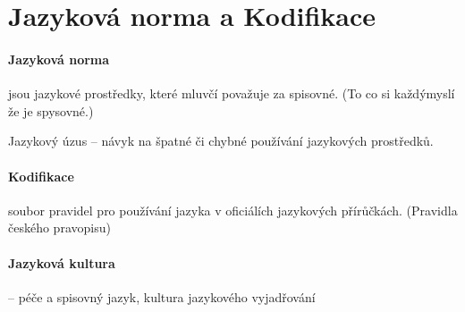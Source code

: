 \documentclass[10pt,a4page,headings,openany,%
oneside
,twocolumn
]{report}
\begin{document}
\section{Jazyková norma a Kodifikace}

\paragraph{Jazyková norma} jsou jazykové prostředky, které mluvčí považuje za spisovné. (To co si každýmyslí že je spysovné.) 

Jazykový úzus -- návyk na špatné či chybné používání jazykových prostředků.

\paragraph{Kodifikace} soubor pravidel pro používání jazyka v oficiálích jazykových přírůčkách. (Pravidla českého pravopisu)

\paragraph{Jazyková kultura} -- péče a spisovný jazyk, kultura jazykového vyjadřování	
\end{document}
